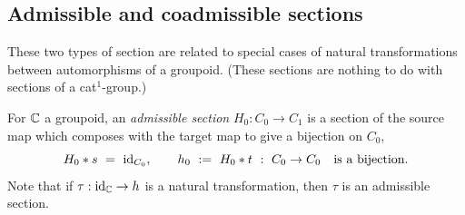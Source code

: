 

\newpage
\subsection{Admissible and coadmissible sections} \label{subsect:admissible}

These two types of section are related to special cases of 
natural transformations between automorphisms of a groupoid. 
(These sections are nothing to do with sections of a cat$^1$-group.) 

For $\mathbb{C}$ a groupoid, an \emph{admissible section} $H_0 : C_0 \to C_1$ 
is a section of the source map which composes with the target map to give 
a bijection on $C_0$, 
$$
H_0 * s ~=~ \mathrm{id}_{C_0}, \qquad 
h_0 ~:=~ H_0 * t ~:~ C_0 \to C_0 \quad\text{is a bijection}. 
$$
Note that if $\tau : \mathrm{id}_{\mathbb{C}} \to h$ is a natural transformation, 
then $\tau$ is an admissible section. 

